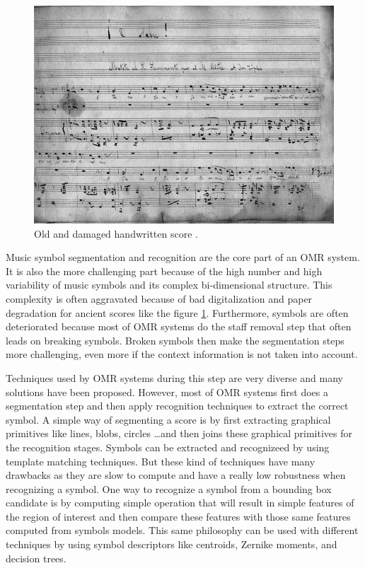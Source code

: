 \documentclass[11pt]{sdm}
\begin{document}
\begin{figure}[btp]
  \centering
  \includegraphics[scale=0.5]{img/old_score}
  \caption{\label{old_score} Old and damaged handwritten score \cite{fornes_analysis_2014}. }
\end{figure}
Music symbol segmentation and recognition are the core part of an OMR system.
It is also the more challenging part because of the high number and high variability of music symbols and its complex bi-dimensional structure.
This complexity is often aggravated because of bad digitalization and paper degradation for ancient scores like the figure \ref{old_score}.
Furthermore, symbols are often deteriorated because most of OMR systems do the staff removal step that often leads on breaking symbols.
Broken symbols then make the segmentation steps more challenging, even more if the context information is not taken into account.

Techniques used by OMR systems during this step are very diverse and many solutions have been proposed.
However, most of OMR systems first does a segmentation step and then apply recognition techniques to extract the correct symbol.
A simple way of segmenting a score is by first extracting graphical primitives like lines, blobs, circles \ldots and then joins these graphical primitives for the recognition stages.
Symbols can be extracted and recognizeed by using template matching techniques.
But these kind of techniques have many drawbacks as they are slow to compute and have a really low robustness when recognizing a symbol.
One way to recognize a symbol from a bounding box candidate is by computing simple operation that will result in simple features of the region of interest and then compare these features with those same features computed from symbols models.
This same philosophy can be used with different techniques by using symbol descriptors like centroids, Zernike moments, and decision trees.
\end{document}
